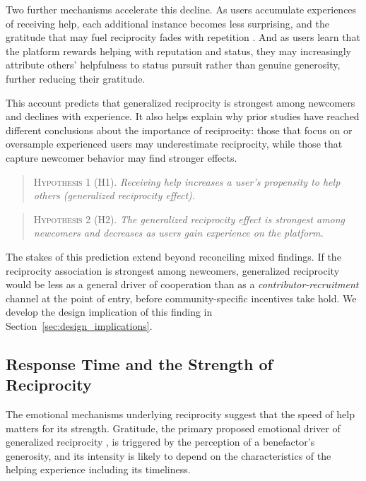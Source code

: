 Two further mechanisms accelerate this decline. As users accumulate experiences of receiving help, each additional instance becomes less surprising, and the gratitude that may fuel reciprocity fades with repetition \citep{mccullough_adaptation_2008}. And as users learn that the platform rewards helping with reputation and status, they may increasingly attribute others' helpfulness to status pursuit rather than genuine generosity, further reducing their gratitude.

This account predicts that generalized reciprocity is strongest among newcomers and declines with experience. It also helps explain why prior studies have reached different conclusions about the importance of reciprocity: those that focus on or oversample experienced users may underestimate reciprocity, while those that capture newcomer behavior may find stronger effects.

\begin{quote}
\textsc{Hypothesis 1 (H1).} \emph{Receiving help increases a user's propensity to help others (generalized reciprocity effect).}
\end{quote}

\begin{quote}
\textsc{Hypothesis 2 (H2).} \emph{The generalized reciprocity effect is strongest among newcomers and decreases as users gain experience on the platform.}
\end{quote}

The stakes of this prediction extend beyond reconciling mixed findings. If the reciprocity association is strongest among newcomers, generalized reciprocity would be less as a general driver of cooperation than as a \textit{contributor-recruitment} channel at the point of entry, before community-specific incentives take hold. We develop the design implication of this finding in Section~\ref{sec:design_implications}.

\subsection{Response Time and the Strength of Reciprocity}

The emotional mechanisms underlying reciprocity suggest that the speed of help matters for its strength. Gratitude, the primary proposed emotional driver of generalized reciprocity \citep{mccullough_is_2001}, is triggered by the perception of a benefactor's generosity, and its intensity is likely to depend on the characteristics of the helping experience including its timeliness.

